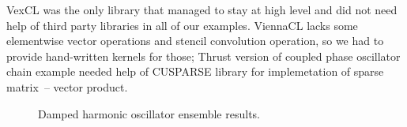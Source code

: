 \documentclass[final]{siamltex}
\begin{document}
VexCL was the only library that managed to stay at high level and did not need
help of third party libraries in all of our examples. ViennaCL lacks some
elementwise vector operations and stencil convolution operation, so we had to
provide hand-written kernels for those; Thrust version of coupled phase
oscillator chain example needed help of CUSPARSE library for implemetation of
sparse matrix~-- vector product.


\begin{figure}
    \begin{center}
    \end{center}
    \caption{Damped harmonic oscillator ensemble results.}
    \label{fig:damped:perf}
\end{figure}
\end{document}
